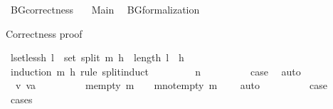 %
\begin{isabellebody}%
%
%
\isadelimtheory
%
\endisadelimtheory
%
\isatagtheory
{}\isamarkupfalse%
\ BG{\isacharunderscore}{\kern0pt}correctness\ \isanewline
\ \ Main\isanewline
\ \ BG{\isacharunderscore}{\kern0pt}formalization\isanewline
{}%
\endisatagtheory
{\isafoldtheory}%
%
\isadelimtheory
%
\endisadelimtheory
%
\begin{isamarkuptext}%
Correctness proof%
\end{isamarkuptext}\isamarkuptrue%
\isamarkupfalse%
\ l{\isacharunderscore}{\kern0pt}set{\isacharunderscore}{\kern0pt}less{\isacharunderscore}{\kern0pt}h{\isacharcolon}{\kern0pt}\ {\isachardoublequoteopen}l\ {\isasymin}\ set\ {\isacharparenleft}{\kern0pt}split\ m\ h{\isacharparenright}{\kern0pt}\ {\isasymLongrightarrow}\ length\ l\ {\isasymle}\ h{\isachardoublequoteclose}\ \ \ \isanewline
%
\isadelimproof
\ \ \ \ %
\endisadelimproof
%
\isatagproof
{}\isamarkupfalse%
\ {\isacharparenleft}{\kern0pt}induction\ m\ h\ rule{\isacharcolon}{\kern0pt}\ split{\isachardot}{\kern0pt}induct{\isacharparenright}{\kern0pt}\isanewline
\ \ \ \ \ \ \isamarkupfalse%
\ {\isacharparenleft}{\kern0pt}{}\ n{\isacharparenright}{\kern0pt}\isanewline
\ \ \ \ \ \ \isamarkupfalse%
\ \isamarkupfalse%
\ {\isacharquery}{\kern0pt}case\ \isamarkupfalse%
\ auto\isanewline
\ \ \ \ \isamarkupfalse%
\isanewline
\ \ \ \ \ \ \isamarkupfalse%
\ {\isacharparenleft}{\kern0pt}{}\ v\ va{\isacharparenright}{\kern0pt}\isanewline
\ \ \ \ \ \ \isamarkupfalse%
\ \isamarkupfalse%
\ {\isacharparenleft}{\kern0pt}m{\isacharunderscore}{\kern0pt}empty{\isacharparenright}{\kern0pt}\ {\isachardoublequoteopen}m\ {\isacharequal}{\kern0pt}\ {\isacharbrackleft}{\kern0pt}{\isacharbrackright}{\kern0pt}{\isachardoublequoteclose}\ {\isacharbar}{\kern0pt}\ {\isacharparenleft}{\kern0pt}m{\isacharunderscore}{\kern0pt}not{\isacharunderscore}{\kern0pt}empty{\isacharparenright}{\kern0pt}\ {\isachardoublequoteopen}m\ {\isasymnoteq}\ {\isacharbrackleft}{\kern0pt}{\isacharbrackright}{\kern0pt}{\isachardoublequoteclose}\ \isamarkupfalse%
\ auto\isanewline
\ \ \ \ \ \ \isamarkupfalse%
\ \isamarkupfalse%
\ {\isacharquery}{\kern0pt}case\isanewline
\ \ \ \ \isamarkupfalse%
\ cases\isanewline

\end{isabellebody}
